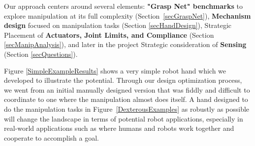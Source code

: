 Our approach centers around several elements:  {\bf "Grasp Net" benchmarks} to explore manipulation at its full complexity (Section~\ref{secGraspNet}), {\bf Mechanism design} focused on manipulation tasks (Section \ref{secHandDesign}),  Strategic Placement of {\bf Actuators, Joint Limits, and Compliance} (Section \ref{secManipAnalysis}), and later in the project Strategic consideration of {\bf Sensing} (Section \ref{secQuestions}).

Figure \ref{SimpleExampleResults} shows a very simple robot hand which we developed to illustrate the potential.  Through our design optimization process, we went from an initial manually designed version that was fiddly and difficult to coordinate to one where the manipulation almost does itself.  A hand designed to do the manipulation tasks in Figure~\ref{DexterousExamples} as robustly as possible will change the landscape in terms of potential robot applications, especially in real-world applications such as where humans and robots work together and cooperate to accomplish a goal.


	


